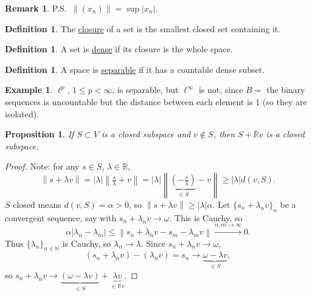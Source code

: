 \documentclass[12pt]{article}
\newcommand{\abs}[1]{\left| #1 \right|}
\newcommand{\norm}[1]{\left\| #1 \right\|}
\newcommand{\R}{\mathbb{R}}
\newcommand{\N}{\mathbb{N}}
\newtheorem{prop}[thm]{Proposition}
\theoremstyle{definition}
\newtheorem{defn}[thm]{Definition}
\newtheorem{ex}[thm]{Example}
\newtheorem{rmk}[thm]{Remark}
\begin{document}
\begin{rmk}
	P.S.\ $\norm{(x_n)} = \sup \abs{x_n}$.
\end{rmk}

\begin{defn}
	The \underline{closure} of a set is the smallest closed set containing it.
\end{defn}

\begin{defn}
	A set is \underline{dense} if its closure is the whole space.
\end{defn}

\begin{defn}
	A space is \underline{separable} if it has a countable dense subset.
\end{defn}

\begin{ex}
	$\ell^p$, $1 \leq p < \infty$, is separable, but $\ell^\infty$ is not, since $B = $ the binary sequences is uncountable but the distance between each element is $1$ (so they are isolated).
\end{ex}

\begin{prop}
	If $S \subset V$ is a closed subspace and $v \notin S$, then $S + \R v$ is a closed subspace.
\end{prop}
\begin{proof}
	Note: for any $s \in S$, $\lambda \in \R$,
	\begin{equation*}
		\norm{s + \lambda v} = \abs{\lambda} \norm{\tfrac{s}{\lambda} + v} = \abs{\lambda} \norm{\underbrace{\left( -\tfrac{s}{\lambda} \right)}_{\in S} - v} \geq \abs{\lambda} d(v, S).
	\end{equation*}
	$S$ closed means $d(v,S) = \alpha > 0$, so $\norm{s + \lambda v} \geq \abs{\lambda} \alpha$.
	Let $\lbrace s_n + \lambda_n v \rbrace_n$ be a convergent sequence, say with $s_n + \lambda_n v \to \omega$.
	This is Cauchy, so
	\begin{equation*}
		\alpha \abs{\lambda_n - \lambda_m} \leq \norm{s_n + \lambda_n v - s_m - \lambda_m v} \xrightarrow{n,m \to \infty} 0.
	\end{equation*}
	Thus $\lbrace \lambda_n \rbrace_{n \in \N}$ is Cauchy, so $\lambda_n \to \lambda$.
	Since $s_n + \lambda_n v \to \omega$,
	\begin{equation*}
		(s_n + \lambda_n v) - (\lambda_n v) = s_n \to \underbrace{\omega - \lambda v}_{\in S},
	\end{equation*}
	so $s_n + \lambda_n v \to \underbrace{(\omega - \lambda v)}_{\in S} + \underbrace{\lambda v}_{\in \R v}$.
\end{proof}
\end{document}
